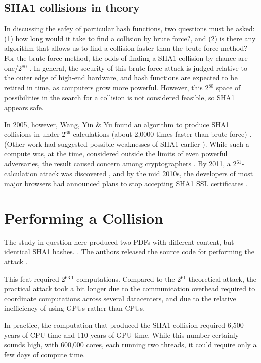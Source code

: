 \documentclass[sigconf]{acmart}
\begin{document}
\subsection{SHA1 collisions in theory}
\label{sec:org326d25b}

In discussing the safey of particular hash functions, two questions must be asked:
(1) how long would it take to find a collision by brute force?, and 
(2) is there any algorithm that allows us to find a collision faster than the brute force method?
For the brute force method, the odds of finding a SHA1 collision by chance are one/2\(^{\text{80}}\)
\cite{Schneier2005}.
In general, the security of this brute-force attack is judged relative to the outer edge of high-end hardware, and hash functions are expected to be retired in time, as computers grow more powerful.
However, this 2\(^{\text{80}}\) space of possibilities in the search for a collision is not considered feasible, so SHA1 appears safe.

In 2005, however, Wang, Yin \& Yu found an algorithm to produce SHA1 collisions in under 2\(^{\text{69}}\) calculations (about 2,0000 times faster than brute force)
\cite{Wang2005}.
(Other work had suggested possible weaknesses of SHA1 earlier \cite{Biham2005}).
While such a compute was, at the time, considered outside the limits of even powerful adversaries,
the result caused concern among cryptographers \cite{Schneier2005}.
By 2011, a 2\(^{\text{61}}\)-calculation attack was discovered \cite{Stevens2013a},
and by the mid 2010s, the developers of most major browsers had announced plans to stop accepting SHA1 SSL certificates 
\cite{Mozilla2017,Sleevi2014}.

\section{Performing a Collision}
\label{sec:org8d7e57d}

The study in question here produced two PDFs with different content, but identical SHA1 hashes.
\cite{Stevens2017}.
The authors released the source code for performing the attack
\cite{Stevens2017github}.

This feat required 2\(^{\text{63.1}}\) computations. 
Compared to the 2\(^{\text{61}}\) theoretical attack, the practical attack took a bit longer due to the communication overhead required to coordinate computations across several datacenters, and due to the relative inefficiency of using GPUs rather than CPUs.

In practice, the computation that produced the SHA1 collision required 6,500 years of CPU time and 110 years of GPU time. While this number certainly sounds high, with 600,000 cores, each running two threads, it could require only a few days of compute time.
\end{document}
